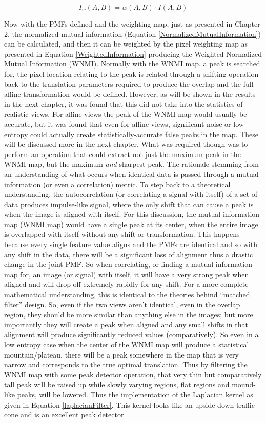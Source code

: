 \begin{equation}
\label{WeightedInformation}
	I_{w}(A,B)=w(A,B) \cdot I(A,B)
\end{equation}

Now with the PMFs defined and the weighting map, just as presented in Chapter 2, the normalized mutual information (Equation \ref{NormalizedMutualInformation}) can be calculated, and then it can be weighted by the pixel weighting map as presented in Equation \ref{WeightedInformation} producing the Weighted Normalized Mutual Information (WNMI). Normally with the WNMI map, a peak is searched for, the pixel location relating to the peak is related through a shifting operation back to the translation parameters required to produce the overlap and the full affine transformation would be defined. However, as will be shown in the results in the next chapter, it was found that this did not take into the statistics of realistic views. For affine views the peak of the WNMI map would usually be accurate, but it was found that even for affine views, significant noise or low entropy could actually create statistically-accurate false peaks in the map. These will be discussed more in the next chapter. What was required though was to perform an operation that could extract not just the maximum peak in the WNMI map, but the maximum \textit{and} sharpest peak. The rationale stemming from an understanding of what occurs when identical data is passed through a mutual information (or even a correlation) metric. To step back to a theoretical understanding, the autocorrelation (or correlating a signal with itself) of a set of data produces impulse-like signal, where the only shift that can cause a peak is when the image is aligned with itself. For this discussion, the mutual information map (WNMI map) would have a single peak at its center, when the entire image is overlapped with itself without any shift or transformation. This happens because every single feature value aligns and the PMFs are identical and so with any shift in the data, there will be a significant loss of alignment thus a drastic change in the joint PMF. So when correlating, or finding a mutual information map for, an image (or signal) with itself, it will have a very strong peak when aligned and will drop off extremely rapidly for any shift. For a more complete mathematical understanding, this is identical to the theories behind ``matched filter'' design. So, even if the two views aren't identical, even in the overlap region, they should be more similar than anything else in the images; but more importantly they will create a peak when aligned and any small shifts in that alignment will produce significantly reduced values (comparatively). So even in a low entropy case when the center of the WNMI map will produce a statistical mountain/plateau, there will be a peak somewhere in the map that is very narrow and corresponds to the true optimal translation. Thus by filtering the WNMI map with some peak detector operation, that very thin but comparatively tall peak will be raised up while slowly varying regions, flat regions and mound-like peaks, will be lowered. Thus the implementation of the Laplacian kernel as given in Equation \ref{laplacianFilter}. This kernel looks like an upside-down traffic cone and is an excellent peak detector.


